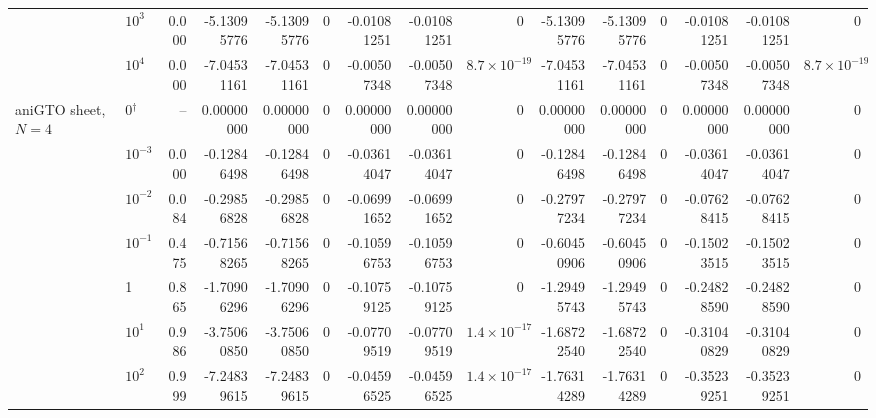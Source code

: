 \begin{tabular}{@{}llr rrr rrr rrr rrr@{}}
 & $10^{3}$ & 0.000 & -5.13095776 & -5.13095776 & \textcolor{green!50!black}{0} & -0.01081251 & -0.01081251 & \textcolor{green!50!black}{0} & -5.13095776 & -5.13095776 & \textcolor{green!50!black}{0} & -0.01081251 & -0.01081251 & \textcolor{green!50!black}{0} \\
 & $10^{4}$ & 0.000 & -7.04531161 & -7.04531161 & \textcolor{green!50!black}{0} & -0.00507348 & -0.00507348 & \textcolor{green!50!black}{$8.7\times10^{-19}$} & -7.04531161 & -7.04531161 & \textcolor{green!50!black}{0} & -0.00507348 & -0.00507348 & \textcolor{green!50!black}{$8.7\times10^{-19}$} \\
\addlinespace
aniGTO sheet, $N=4$ & 0$^{\dagger}$ & -- & 0.00000000 & 0.00000000 & \textcolor{green!50!black}{0} & 0.00000000 & 0.00000000 & \textcolor{green!50!black}{0} & 0.00000000 & 0.00000000 & \textcolor{green!50!black}{0} & 0.00000000 & 0.00000000 & \textcolor{green!50!black}{0} \\
 & $10^{-3}$ & 0.000 & -0.12846498 & -0.12846498 & \textcolor{green!50!black}{0} & -0.03614047 & -0.03614047 & \textcolor{green!50!black}{0} & -0.12846498 & -0.12846498 & \textcolor{green!50!black}{0} & -0.03614047 & -0.03614047 & \textcolor{green!50!black}{0} \\
 & $10^{-2}$ & 0.084 & -0.29856828 & -0.29856828 & \textcolor{green!50!black}{0} & -0.06991652 & -0.06991652 & \textcolor{green!50!black}{0} & -0.27977234 & -0.27977234 & \textcolor{green!50!black}{0} & -0.07628415 & -0.07628415 & \textcolor{green!50!black}{0} \\
 & $10^{-1}$ & 0.475 & -0.71568265 & -0.71568265 & \textcolor{green!50!black}{0} & -0.10596753 & -0.10596753 & \textcolor{green!50!black}{0} & -0.60450906 & -0.60450906 & \textcolor{green!50!black}{0} & -0.15023515 & -0.15023515 & \textcolor{green!50!black}{0} \\
 & 1 & 0.865 & -1.70906296 & -1.70906296 & \textcolor{green!50!black}{0} & -0.10759125 & -0.10759125 & \textcolor{green!50!black}{0} & -1.29495743 & -1.29495743 & \textcolor{green!50!black}{0} & -0.24828590 & -0.24828590 & \textcolor{green!50!black}{0} \\
 & $10^{1}$ & 0.986 & -3.75060850 & -3.75060850 & \textcolor{green!50!black}{0} & -0.07709519 & -0.07709519 & \textcolor{green!50!black}{$1.4\times10^{-17}$} & -1.68722540 & -1.68722540 & \textcolor{green!50!black}{0} & -0.31040829 & -0.31040829 & \textcolor{green!50!black}{0} \\
 & $10^{2}$ & 0.999 & -7.24839615 & -7.24839615 & \textcolor{green!50!black}{0} & -0.04596525 & -0.04596525 & \textcolor{green!50!black}{$1.4\times10^{-17}$} & -1.76314289 & -1.76314289 & \textcolor{green!50!black}{0} & -0.35239251 & -0.35239251 & \textcolor{green!50!black}{0} \\

\end{tabular}
